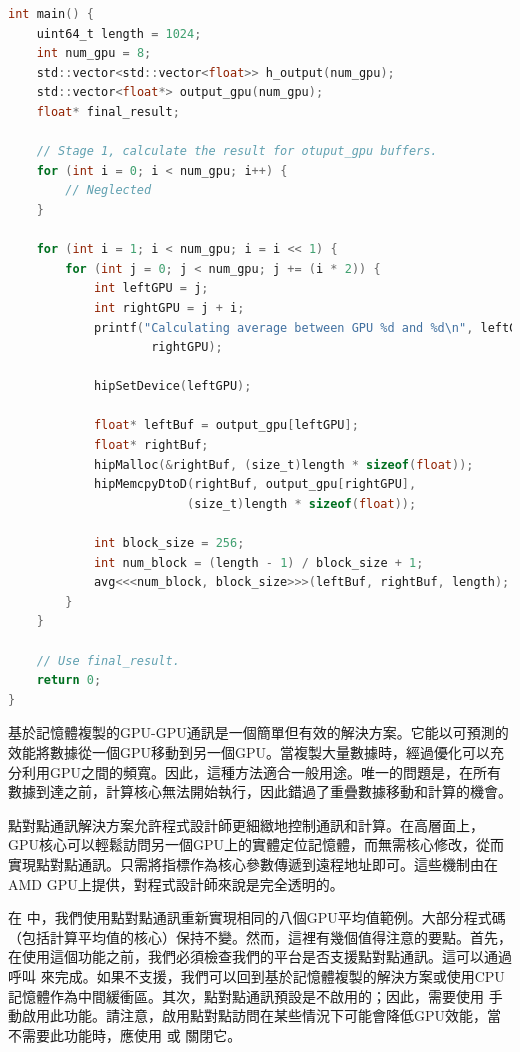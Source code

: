 \begin{lstlisting}[language=C, caption={用device-to-device記憶體複製達到多GPU溝通}, captionpos=t, label={lst:dtd_mutiGPUs}]
int main() {
    uint64_t length = 1024;
    int num_gpu = 8;
    std::vector<std::vector<float>> h_output(num_gpu);
    std::vector<float*> output_gpu(num_gpu);
    float* final_result;
    
    // Stage 1, calculate the result for otuput_gpu buffers.
    for (int i = 0; i < num_gpu; i++) {
        // Neglected
    }

    for (int i = 1; i < num_gpu; i = i << 1) {
        for (int j = 0; j < num_gpu; j += (i * 2)) {
            int leftGPU = j;
            int rightGPU = j + i;
            printf("Calculating average between GPU %d and %d\n", leftGPU,
                    rightGPU);
            
            hipSetDevice(leftGPU);
            
            float* leftBuf = output_gpu[leftGPU];
            float* rightBuf;
            hipMalloc(&rightBuf, (size_t)length * sizeof(float));
            hipMemcpyDtoD(rightBuf, output_gpu[rightGPU],
                         (size_t)length * sizeof(float));
            
            int block_size = 256;
            int num_block = (length - 1) / block_size + 1;
            avg<<<num_block, block_size>>>(leftBuf, rightBuf, length);
        }
    }
    
    // Use final_result.
    return 0;
}
\end{lstlisting}

基於記憶體複製的GPU-GPU通訊是一個簡單但有效的解決方案。它能以可預測的效能將數據從一個GPU移動到另一個GPU。當複製大量數據時，經過優化可以充分利用GPU之間的頻寬。因此，這種方法適合一般用途。唯一的問題是，在所有數據到達之前，計算核心無法開始執行，因此錯過了重疊數據移動和計算的機會。

點對點通訊解決方案允許程式設計師更細緻地控制通訊和計算。在高層面上，GPU核心可以輕鬆訪問另一個GPU上的實體定位記憶體，而無需核心修改，從而實現點對點通訊。只需將指標作為核心參數傳遞到遠程地址即可。這些機制由在AMD GPU上提供，對程式設計師來說是完全透明的。

在  中，我們使用點對點通訊重新實現相同的八個GPU平均值範例。大部分程式碼（包括計算平均值的核心）保持不變。然而，這裡有幾個值得注意的要點。首先，在使用這個功能之前，我們必須檢查我們的平台是否支援點對點通訊。這可以通過呼叫 來完成。如果不支援，我們可以回到基於記憶體複製的解決方案或使用CPU記憶體作為中間緩衝區。其次，點對點通訊預設是不啟用的；因此，需要使用 手動啟用此功能。請注意，啟用點對點訪問在某些情況下可能會降低GPU效能，當不需要此功能時，應使用 或 關閉它。

